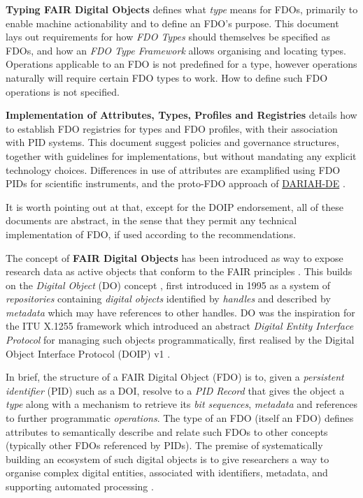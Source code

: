 \documentclass[fleqn,10pt,lineno]{wlpeerjlua}
\begin{document}
\textbf{Typing FAIR Digital Objects} \cite{ZFzPxCNB} defines what \emph{type} means for FDOs, primarily to enable machine actionability and to define an FDO's purpose. This document lays out requirements for how \emph{FDO Types} should themselves be specified as FDOs, and how an \emph{FDO Type Framework} allows organising and locating types. Operations applicable to an FDO is not predefined for a type, however operations naturally will require certain FDO types to work. How to define such FDO operations is not specified.

\textbf{Implementation of Attributes, Types, Profiles and Registries} \cite{126uxr5pI} details how to establish FDO registries for types and FDO profiles, with their association with PID systems. This document suggest policies and governance structures, together with guidelines for implementations, but without mandating any explicit technology choices. Differences in use of attributes are examplified using FDO PIDs for scientific instruments, and the proto-FDO approach of \href{https://de.dariah.eu/}{DARIAH-DE} \cite{1CqIZ47pu}.

It is worth pointing out at that, except for the DOIP endorsement, all of these documents are abstract, in the sense that they permit any technical implementation of FDO, if used according to the recommendations.

The concept of \textbf{FAIR Digital Objects} \cite{IHLT6hye} has been introduced as way to expose research data as active objects that conform to the FAIR principles \cite{6DjakjNS}. This builds on the \emph{Digital Object} (DO) concept \cite{11MnuwJ4l}, first introduced in 1995 \cite{3Uqe3fuK} as a system of \emph{repositories} containing \emph{digital objects} identified by \emph{handles} and described by \emph{metadata} which may have references to other handles. DO was the inspiration for the ITU X.1255 framework \cite{103Hw8H43} which introduced an abstract \emph{Digital Entity Interface Protocol} for managing such objects programmatically, first realised by the Digital Object Interface Protocol (DOIP) v1 \cite{16uB3jxpa}.

In brief, the structure of a FAIR Digital Object (FDO) is to, given a \emph{persistent identifier} (PID) such as a DOI, resolve to a \emph{PID Record} that gives the object a \emph{type} along with a mechanism to retrieve its \emph{bit sequences}, \emph{metadata} and references to further programmatic \emph{operations}. The type of an FDO (itself an FDO) defines attributes to semantically describe and relate such FDOs to other concepts (typically other FDOs referenced by PIDs). The premise of systematically building an ecosystem of such digital objects is to give researchers a way to organise complex digital entities, associated with identifiers, metadata, and supporting automated processing \cite{tz0P3DTC}.
\end{document}
